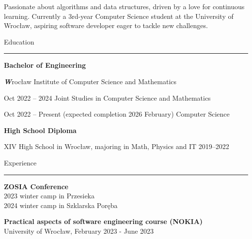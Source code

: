 \documentclass{letter}
\begin{document}
\hfill
\begin{minipage}[t]{0.70\textwidth}
\setlength{\baselineskip}{1.5\baselineskip}

\begin{tcolorbox}[colback=white, colframe=white, width=\textwidth, boxrule=0pt, sharp corners, height=\textheight, left=5mm, right=5mm, top=5mm, bottom=5mm]

\color{black}

\vspace{0.5cm}
{\fontsize{30pt}{1pt} \textbf \FullName}

\vspace{0.3cm}

\begin{spacing}{1.125}
\small 
Passionate about algorithms and data structures, driven by a love for continuous learning. Currently a 3rd-year Computer Science student at the University of Wrocław, aspiring software developer eager to tackle new challenges.

\end{spacing}

\vspace{\SectionSpacing}

{\large Education}
\rule{\linewidth}{0.4pt}

{\large \textbf{Bachelor of Engineering}} 

{\textit \textbf Wrocław Institute of Computer Science and Mathematics}

{\small Oct 2022 -- 2024}
{Joint Studies in Computer Science and Mathematics }

{\small Oct 2022 -- Present (expected completion 2026 February)}
{Computer Science}

{\large \textbf{High School Diploma}}

{\small XIV High School in Wrocław, majoring in Math, Physics and IT  2019--2022}


\vspace{\SectionSpacing}

{\large Experience}
\rule{\linewidth}{0.4pt}

\textbf{ZOSIA Conference} \\
\vspace{-1mm}
{\small 2023 winter camp in Przesieka} \\
\vspace{-2mm}
{\small 2024 winter camp in Szklarska Poręba}

\textbf{Practical aspects of software engineering course (NOKIA)} \\
{\small University of Wrocław, February 2023 - June 2023}


\end{tcolorbox}
\end{minipage}
\end{document}
